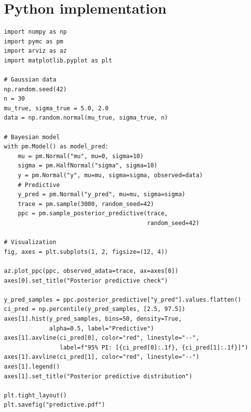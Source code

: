 \section{Python implementation}

\begin{codeblock}[title=\textbf{Posterior predictive distribution}]
\begin{verbatim}
import numpy as np
import pymc as pm
import arviz as az
import matplotlib.pyplot as plt

# Gaussian data
np.random.seed(42)
n = 30
mu_true, sigma_true = 5.0, 2.0
data = np.random.normal(mu_true, sigma_true, n)

# Bayesian model
with pm.Model() as model_pred:
    mu = pm.Normal("mu", mu=0, sigma=10)
    sigma = pm.HalfNormal("sigma", sigma=10)
    y = pm.Normal("y", mu=mu, sigma=sigma, observed=data)
    # Predictive
    y_pred = pm.Normal("y_pred", mu=mu, sigma=sigma)
    trace = pm.sample(3000, random_seed=42)
    ppc = pm.sample_posterior_predictive(trace,
                                         random_seed=42)

# Visualization
fig, axes = plt.subplots(1, 2, figsize=(12, 4))

az.plot_ppc(ppc, observed_adata=trace, ax=axes[0])
axes[0].set_title("Posterior predictive check")

y_pred_samples = ppc.posterior_predictive["y_pred"].values.flatten()
ci_pred = np.percentile(y_pred_samples, [2.5, 97.5])
axes[1].hist(y_pred_samples, bins=50, density=True,
             alpha=0.5, label="Predictive")
axes[1].axvline(ci_pred[0], color="red", linestyle="--",
                label=f"95% PI: [{ci_pred[0]:.1f}, {ci_pred[1]:.1f}]")
axes[1].axvline(ci_pred[1], color="red", linestyle="--")
axes[1].legend()
axes[1].set_title("Posterior predictive distribution")

plt.tight_layout()
plt.savefig("predictive.pdf")
\end{verbatim}
\end{codeblock}

